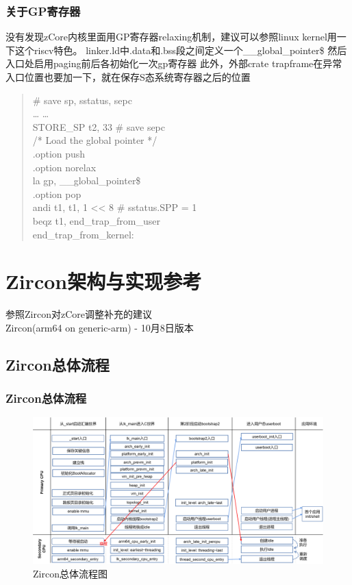 \documentclass[
8pt, %
]{beamer}
\begin{document}
	\begin{frame}
		\frametitle{关于GP寄存器}
		没有发现zCore内核里面用GP寄存器relaxing机制，建议可以参照linux kernel用一下这个riscv特色。
		linker.ld中.data和.bss段之间定义一个\_\_global\_pointer\$
		然后入口处启用paging前后各初始化一次gp寄存器
		此外，外部crate trapframe在异常入口位置也要加一下，就在保存S态系统寄存器之后的位置
		\begin{quote}
			\# save sp, sstatus, sepc\\
			… …\\
			STORE\_SP t2, 33         \# save sepc\\
			\vspace {8pt}
			/* Load the global pointer */\\
			.option push\\
			.option norelax\\
			la gp, \_\_global\_pointer\$\\
			.option pop\\
			\vspace {8pt}
			andi t1, t1, 1 << 8     \# sstatus.SPP = 1\\
			beqz t1, end\_trap\_from\_user\\
			end\_trap\_from\_kernel:
		\end{quote}
	\end{frame}

	\section{Zircon架构与实现参考}

	\begin{frame}
		\begin{center}
			{\LARGE 参照Zircon对zCore调整补充的建议\\}
			\bigskip\bigskip
			{\large Zircon(arm64 on generic-arm) - 10月8日版本}
		\end{center}
	\end{frame}

	\subsection{Zircon总体流程}

	\begin{frame}
		\frametitle{Zircon总体流程}
		\begin{figure}
			\includegraphics[width=1.0\linewidth]{zircon_flow.png}
			\caption{Zircon总体流程图}
		\end{figure}
	\end{frame}
\end{document}

